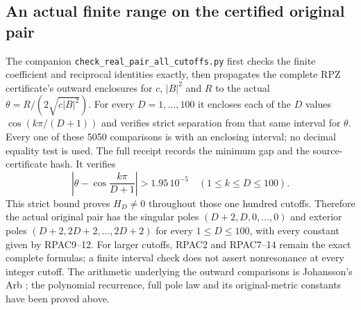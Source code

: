 \subsection{An actual finite range on the certified original pair}
The companion \nolinkurl{check_real_pair_all_cutoffs.py} first
checks the finite coefficient and reciprocal identities exactly,
then propagates the complete RPZ certificate's outward enclosures
for $c$, $|B|^2$ and $R$ to the actual
$\theta=R/(2\sqrt{c|B|^2})$. For every $D=1,\ldots,100$ it
encloses each of the $D$ values $\cos(k\pi/(D+1))$ and verifies
strict separation from that same interval for $\theta$.
Every one of these 5050 comparisons is with an enclosing interval;
no decimal equality test is used. The full receipt records the
minimum gap and the source-certificate hash. It verifies
\[
 \left|\theta-\cos\frac{k\pi}{D+1}\right|>1.95\,10^{-5}
 \quad(1\le k\le D\le100).\tag{RPAC15}
\]
This strict bound proves $H_D\ne0$ throughout those one hundred
cutoffs. Therefore the actual original pair has the singular poles
$(D+2,D,0,\ldots,0)$ and exterior poles
$(D+2,2D+2,\ldots,2D+2)$ for every $1\le D\le100$,
with every constant given by RPAC9--12. For larger cutoffs,
RPAC2 and RPAC7--14 remain the exact complete formulas; a finite
interval check does not assert nonresonance at every integer cutoff.
The arithmetic underlying the outward comparisons is Johansson's
Arb \cite{human:arb2016}; the polynomial recurrence, full pole law
and its original-metric constants have been proved above.

